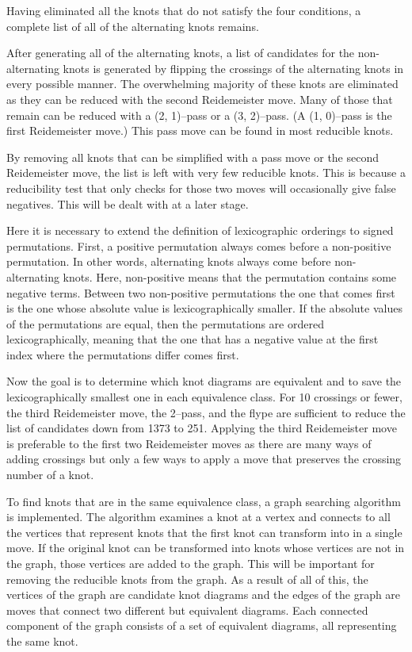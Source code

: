 \begin{paper}
Having eliminated all the knots that do not satisfy the four conditions, a
complete list of all of the alternating knots remains.


After generating all of the alternating knots, a list of candidates for the
non-alternating knots is generated by flipping the crossings of the alternating
knots in every possible manner.
The overwhelming majority of these knots are eliminated as they can be reduced
with the second Reidemeister move.
Many of those that remain can be reduced with a (2, 1)--pass or a (3, 2)--pass.
(A (1, 0)--pass is the first Reidemeister move.)
This pass move can be found in most reducible knots.

By removing all knots that can be simplified with a pass move or the second
Reidemeister move, the list is left with very few reducible knots.
This is because a reducibility test that only checks for those two moves will
occasionally give false negatives.
This will be dealt with at a later stage.


Here it is necessary to extend the definition of lexicographic orderings to
signed permutations.
First, a positive permutation always comes before a non-positive permutation.
In other words, alternating knots always come before non-alternating knots.
Here, non-positive means that the permutation contains some negative terms.
Between two non-positive permutations the one that comes first is the one whose
absolute value is lexicographically smaller.
If the absolute values of the permutations are equal, then the permutations are
ordered lexicographically, meaning that the one that has a negative value at the
first index where the permutations differ comes first.

Now the goal is to determine which knot diagrams are equivalent and to save the
lexicographically smallest one in each equivalence class.
For 10 crossings or fewer, the third Reidemeister move, the 2--pass, and the
flype are sufficient to reduce the list of candidates down from 1373 to 251.
Applying the third Reidemeister move is preferable to the first two
Reidemeister moves as there are many ways of adding crossings but only a few
ways to apply a move that preserves the crossing number of a knot.

To find knots that are in the same equivalence class, a graph searching
algorithm is implemented.
The algorithm examines a knot at a vertex and connects to all the vertices that
represent knots that the first knot can transform into in a single move.
If the original knot can be transformed into knots whose vertices are not in the
graph, those vertices are added to the graph.
This will be important for removing the reducible knots from the graph.
As a result of all of this, the vertices of the graph are candidate knot
diagrams and the edges of the graph are moves that connect two different but
equivalent diagrams.
Each connected component of the graph consists of a set of equivalent diagrams,
all representing the same knot.


\end{paper}
